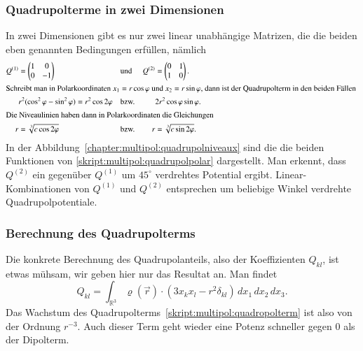 \subsubsection{Quadrupolterme in zwei Dimensionen}
In zwei Dimensionen gibt es nur zwei linear unabhängige Matrizen, die die
beiden eben genannten Bedingungen erfüllen, nämlich
\begin{align}
Q^{(1)}&=\begin{pmatrix}1&0\\0&-1\end{pmatrix}
&&\text{und}&
Q^{(2)}&=\begin{pmatrix}0&1\\1&0\end{pmatrix}.
\label{skript:multipol:qmatrix}
\\
\intertext{%
Schreibt man in Polarkoordinaten $x_1=r\cos\varphi$ und $x_2=r\sin\varphi$,
dann ist der Quadrupolterm in den beiden Fällen
}
&r^2(\cos^2\varphi-\sin^2\varphi)=r^2\cos 2\varphi
&&\text{bzw.}&
&2r^2\cos\varphi\sin\varphi.
\notag
\\
\intertext{%
Die Niveaulinien haben dann in Polarkoordinaten die Gleichungen
}
r&=\sqrt[3]{c \cos2\varphi}
&&\text{bzw.}&
r&=\sqrt[3]{c \sin2\varphi}.
\label{skript:multipol:quadrupolpolar}
\end{align}
In der Abbildung~\ref{chapter:multipol:quadrupolniveaux} sind die die
beiden Funktionen von
\eqref{skript:multipol:quadrupolpolar} dargestellt.
Man erkennt, dass $Q^{(2)}$ ein gegenüber $Q^{(1)}$ um $45^\circ$ verdrehtes
Potential ergibt.
Linear-Kombinationen von $Q^{(1)}$ und $Q^{(2)}$ entsprechen um beliebige
Winkel verdrehte Quadrupolpotentiale.

\subsubsection{Berechnung des Quadrupolterms}
Die konkrete Berechnung des Quadrupolanteils, also der Koeffizienten
$Q_{kl}$, ist etwas mühsam, wir geben hier nur das Resultat an.
Man findet
\cite{skript:brandtdahmen}
\[
Q_{kl}
=
\int_{\mathbb R^3}
\varrho(\vec{r}) \cdot (3x_kx_l-r^2\delta_{kl})
\,dx_1\,dx_2\,dx_3.
\]
Das Wachstum des Quadrupolterms~\eqref{skript:multipol:quadropolterm}
ist also von der Ordnung $r^{-3}$.
Auch dieser Term geht wieder eine Potenz schneller gegen $0$ als der
Dipolterm.


